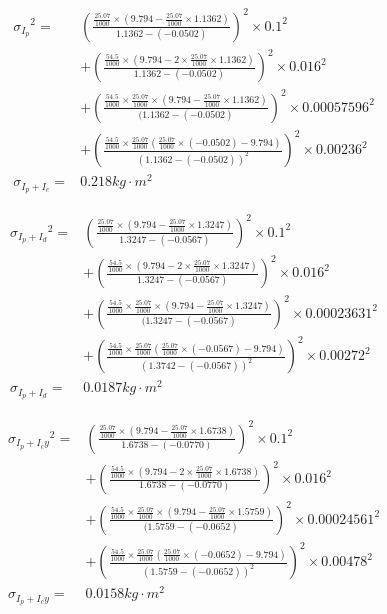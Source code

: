 \documentclass[12pt,a4paper]{article}
\begin{document}
$$
\begin{aligned}
{\sigma_{I_p}}^2=&(\frac{\frac{25.07}{1000}\times(9.794-\frac{25.07}{1000}\times 1.1362)}{1.1362-(-0.0502)})^2\times{0.1}^2\\
&+(\frac{\frac{54.5}{1000}\times(9.794-2\times \frac{25.07}{1000}\times 1.1362)}{1.1362-(-0.0502)})^2\times{0.016}^2\\
&+(\frac{\frac{54.5}{1000}\times \frac{25.07}{1000}\times(9.794-\frac{25.07}{1000}\times 1.1362)}{(1.1362-(-0.0502)})^2\times{0.00057596}^2\\
&+(\frac{\frac{54.5}{1000}\times\frac{25.07}{1000}(\frac{25.07}{1000}\times(-0.0502)-9.794)}{(1.1362-(-0.0502))^2})^2\times{0.00236}^2\\
\sigma_{I_p+I_c}=&0.218kg\cdot m^2
\end{aligned}
$$

$$
\begin{aligned}
{\sigma_{I_p+I_d}}^2=&(\frac{\frac{25.07}{1000}\times(9.794-\frac{25.07}{1000}\times 1.3247)}{1.3247-(-0.0567)})^2\times{0.1}^2\\
&+(\frac{\frac{54.5}{1000}\times(9.794-2\times \frac{25.07}{1000}\times 1.3247)}{1.3247-(-0.0567)})^2\times{0.016}^2\\
&+(\frac{\frac{54.5}{1000}\times \frac{25.07}{1000}\times(9.794-\frac{25.07}{1000}\times 1.3247)}{(1.3247-(-0.0567)})^2\times{0.00023631}^2\\
&+(\frac{\frac{54.5}{1000}\times\frac{25.07}{1000}(\frac{25.07}{1000}\times(-0.0567)-9.794)}{(1.3742-(-0.0567))^2})^2\times{0.00272}^2\\
\sigma_{I_p+I_d}=&0.0187kg\cdot m^2
\end{aligned}
$$

$$
\begin{aligned}
{\sigma_{I_p+I_cy}}^2=&(\frac{\frac{25.07}{1000}\times(9.794-\frac{25.07}{1000}\times 1.6738)}{1.6738-(-0.0770)})^2\times{0.1}^2\\
&+(\frac{\frac{54.5}{1000}\times(9.794-2\times \frac{25.07}{1000}\times 1.6738)}{1.6738-(-0.0770)})^2\times{0.016}^2\\
&+(\frac{\frac{54.5}{1000}\times \frac{25.07}{1000}\times(9.794-\frac{25.07}{1000}\times 1.5759)}{(1.5759-(-0.0652)})^2\times{0.00024561}^2\\
&+(\frac{\frac{54.5}{1000}\times\frac{25.07}{1000}(\frac{25.07}{1000}\times(-0.0652)-9.794)}{(1.5759-(-0.0652))^2})^2\times{0.00478}^2\\
\sigma_{I_p+I_cy}=&0.0158kg\cdot m^2
\end{aligned}
$$
\end{document}
